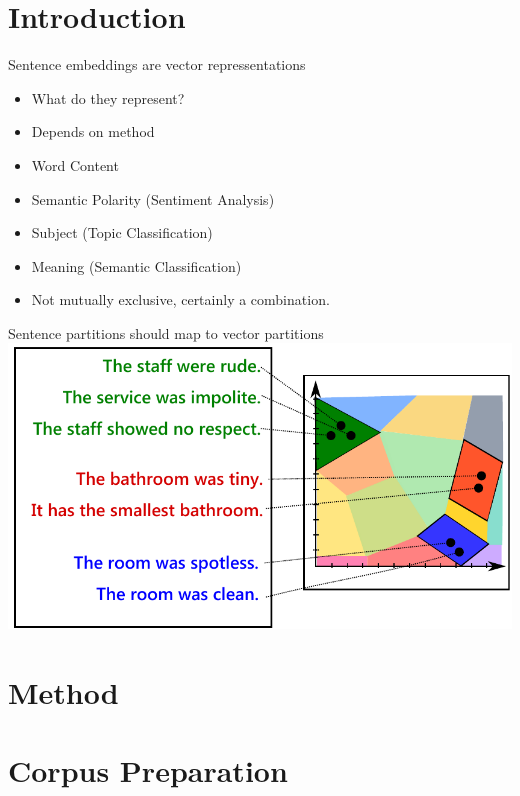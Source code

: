 \documentclass[12pt,landscape,english]{beamer}
\begin{document}
\section{Introduction}
\begingroup %
\begin{frame}{Sentence embeddings are vector repressentations}
	\begin{itemize}
		\item What do they represent?
		\item Depends on method
		
		\item Word Content		
		\item Semantic Polarity (Sentiment Analysis)
		\item Subject (Topic Classification)
		\item Meaning (Semantic Classification)
		\item Not mutually exclusive, certainly a combination.
	\end{itemize}
\end{frame}
\endgroup

\begingroup %
\begin{frame}{Sentence partitions should map to vector partitions}
	\includegraphics[scale=0.6]{equiv}
\end{frame}
\endgroup


\section{Method}
\section{Corpus Preparation}
\end{document}
